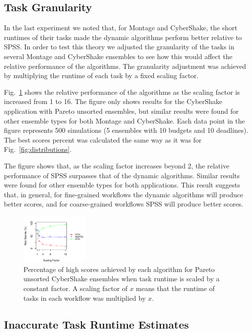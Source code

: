 \documentclass[conference]{IEEEtran}
\begin{document}
\subsection{Task Granularity}

In the last experiment we noted that, for Montage and CyberShake, the short
runtimes of their tasks made the dynamic algorithms perform better relative to
SPSS. In order to test this theory we adjusted the granularity of the tasks in
several Montage and CyberShake ensembles to see how this would affect the
relative performance of the algorithms. The granularity adjustment was
achieved by multiplying the runtime of each task by a fixed scaling factor.

Fig.~\ref{fig:stretching} shows the relative performance of the algorithms
as the scaling factor is increased from 1 to 16. The figure only shows results
for the CyberShake application with Pareto unsorted ensembles, but similar
results were found for other ensemble types for both Montage and CyberShake.
Each data point in the figure represents 500 simulations (5 ensembles with 10
budgets and 10 deadlines). The best scores percent was calculated the same way
as it was for Fig.~\ref{fig:distributions}.

The figure shows that, as the scaling factor increases beyond 2, the relative
performance of SPSS surpasses that of the dynamic algorithms. Similar results
were found for other ensemble types for both applications. This result
suggests that, in general, for fine-grained workflows the dynamic algorithms
will produce better scores, and for coarse-grained workflows SPSS will produce
better scores.

\begin{figure}[tb]
    \centering
    \includegraphics[width=0.3\textwidth]{stretching_cybershake}
    \caption{Percentage of high scores achieved by each algorithm for Pareto 
    unsorted CyberShake ensembles when task runtime is scaled by a constant 
    factor. A scaling factor of $x$ means that the runtime of tasks in each 
    workflow was multiplied by $x$.}
    \label{fig:stretching}
\end{figure}


\subsection{Inaccurate Task Runtime Estimates}
\label{sec:variances}
\end{document}
